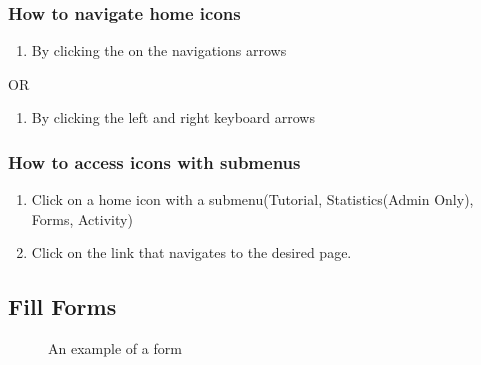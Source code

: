 \documentclass[14pt, a4paper]{article}
\begin{document}
\subsubsection{How to navigate home icons}
\begin{enumerate}
\item By clicking the on the navigations arrows
\end{enumerate}
\begin{center} OR \end{center}
\begin{enumerate}
\item By clicking the left and right keyboard arrows
\end{enumerate}
\subsubsection{How to access icons with submenus}
\begin{enumerate}
\item Click on a home icon with a submenu(Tutorial, Statistics(Admin Only), Forms, Activity)
\item Click on the link that navigates to the desired page.
\end{enumerate}
\subsection{Fill Forms}
\begin{figure}[H]
\centerline{}
\caption{An example of a form}
\label{fig:forms1}
\end{figure}
\end{document}
